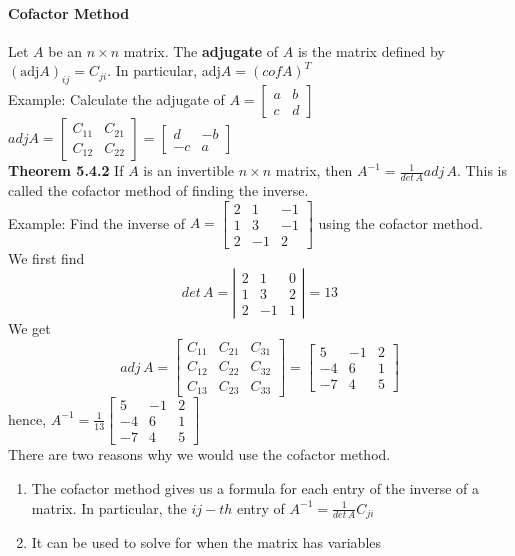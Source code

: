 \documentclass[10pt,letter]{article}
\begin{document}
\paragraph{Cofactor Method} Let $A$ be an $n\times n$ matrix. The \textbf{adjugate} of $A$ is the matrix defined by $(\text{adj}A)_{ij}=C_{ji}$. In particular, adj$A=(cofA)^T$\\ 
Example: Calculate the adjugate of $A=\begin{bmatrix}a&b\\c&d\end{bmatrix}$ \\ 
$adjA=\begin{bmatrix}C_{11}&C_{21}\\C_{12}&C_{22}\end{bmatrix}=\begin{bmatrix}d&-b\\-c&a\end{bmatrix}$ \\ 
\textbf{Theorem 5.4.2} If $A$ is an invertible $n\times n$ matrix, then $A^{-1}=\frac{1}{det\,A}adj\,A$. This is called the cofactor method of finding the inverse. \\ 
Example: Find the inverse of $A=\begin{bmatrix}2&1&-1\\1&3&-1\\2&-1&2\end{bmatrix}$ using the cofactor method. \\ 
We first find $$det\,A=\left|\begin{matrix}2&1&0\\1&3&2\\2&-1&1\end{matrix}\right|=13$$ We get $$adj\,A=\begin{bmatrix}C_{11}&C_{21}&C_{31}\\C_{12}&C_{22}&C_{32}\\C_{13}&C_{23}&C_{33}\end{bmatrix} = \begin{bmatrix}5&-1&2\\-4&6&1\\-7&4&5\end{bmatrix}$$ hence, $A^{-1}=\frac{1}{13}\begin{bmatrix}5&-1&2\\-4&6&1\\-7&4&5\end{bmatrix}$ \\ 
There are two reasons why we would use the cofactor method. \begin{enumerate}
    \item The cofactor method gives us a formula for each entry of the inverse of a matrix. In particular, the $ij-th$ entry of $A^{-1}=\frac{1}{det\,A}C_{ji}$
    \item It can be used to solve for when the matrix has variables
\end{enumerate}
\end{document}
